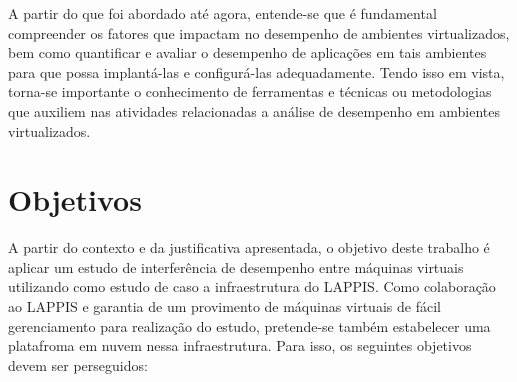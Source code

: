 
A partir do que foi abordado até agora, entende-se que é fundamental compreender os fatores que impactam no desempenho de ambientes virtualizados, bem como quantificar e avaliar o desempenho de aplicações em tais ambientes para que possa implantá-las e configurá-las adequadamente. Tendo isso em vista, torna-se importante o conhecimento de ferramentas e técnicas ou metodologias que auxiliem nas atividades relacionadas a análise de desempenho em ambientes virtualizados. 


\section{Objetivos}


A partir do contexto e da justificativa apresentada, o objetivo deste trabalho é aplicar um estudo de interferência de desempenho entre máquinas virtuais utilizando como estudo de caso a infraestrutura do LAPPIS\footnotemark[2].                                                      Como colaboração ao LAPPIS e garantia de um provimento de máquinas virtuais de fácil gerenciamento para realização do estudo, pretende-se também estabelecer uma platafroma em nuvem nessa infraestrutura. Para isso, os seguintes objetivos devem ser perseguidos: 

